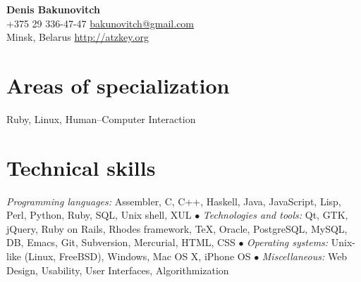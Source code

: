 \documentclass[12pt, a4paper]{article}
\begin{document}
  \newlength{\rcollength}\setlength{\rcollength}{1.85in}%

  \textbf{\Huge Denis Bakunovitch}\\
  {\lining+375 29 336-47-47} \hfill \href{mailto:bakunovitch@gmail.com}{bakunovitch@gmail.com}\\
  Minsk, Belarus \hfill \href{http://atzkey.org}{http://atzkey.org}\\
  \quad\pagebreak[2]
  \hrulefill

  \section*{Areas of specialization}
  Ruby, Linux, Human--Computer Interaction

  \section*{Technical skills}
  \textit{Programming languages:} Assembler, C, C++, Haskell, Java, JavaScript, Lisp, Perl, Python, Ruby, SQL, Unix shell, XUL $\bullet$
  \textit{Technologies and tools:} Qt, GTK, jQuery, Ruby on Rails, Rhodes framework, \TeX, Oracle, PostgreSQL, MySQL, {DB}, Emacs, Git, Subversion, Mercurial, HTML, CSS $\bullet$
  \textit{Operating systems:} Unix-like (Linux, FreeBSD), Windows, Mac OS X, iPhone OS $\bullet$
  \textit{Miscellaneous:} Web Design, Usability, User Interfaces, Algorithmization
\end{document}
